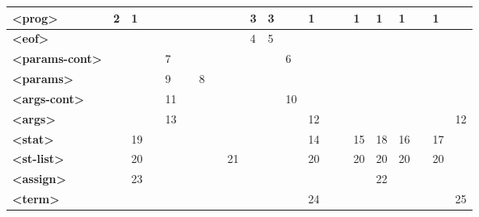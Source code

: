 \documentclass[11pt,a4paper]{article}
\begin{document}
\begin{table}[h!]
\begin{tabular}{|l|l|l|l|l|l|l|l|l|l|l|l|l|l|l|l|l|l|l|l|l|}
        \textbf{\textless{}prog\textgreater{}}        & 2        & 1         &       &       &      &        &       &       & 3                 & 3     &       & 1     &   &   & 1     & 1                             & 1     &        & 1        &         \\ \hline
        \textbf{\textless{}eof\textgreater{}}         &          &           &       &       &      &        &       &       & 4                 & 5     &       &       &   &   &       &                               &       &        &          &         \\ \hline
        \textbf{\textless{}params-cont\textgreater{}} &          &           &       & 7     &      &        &       &       &                   &       & 6     &       &   &   &       &                               &       &        &          &         \\ \hline
        \textbf{\textless{}params\textgreater{} }     &          &           &       & 9     &      & 8      &       &       &                   &       &       &       &   &   &       &                               &       &        &          &         \\ \hline
        \textbf{\textless{}args-cont\textgreater{}}   &          &           &       & 11    &      &        &       &       &                   &       & 10    &       &   &   &       &                               &       &        &          &         \\ \hline
        \textbf{\textless{}args\textgreater{} }       &          &           &       & 13    &      &        &       &       &                   &       &       & 12    &   &   &       &                               &       &        &          & 12      \\ \hline
        \textbf{\textless{}stat\textgreater{}  }      &          & 19        &       &       &      &        &       &       &                   &       &       & 14    &   &   & 15    & 18                            & 16    &        & 17       &         \\ \hline
        \textbf{\textless{}st-list\textgreater{}   }  &          & 20        &       &       &      &        &       & 21    &                   &       &       & 20    &   &   & 20    & 20                            & 20    &        & 20       &         \\ \hline
        \textbf{\textless{}assign\textgreater{}   }   &          & 23        &       &       &      &        &       &       &                   &       &       &       &   &   &       & 22                            &       &        &          &         \\ \hline
        \textbf{\textless{}term\textgreater{}    }    &          &           &       &       &      &        &       &       &                   &       &       & 24    &   &   &       &                               &       &        &          & 25      \\ \hline
    \end{tabular}
    \end{table}
\end{document}
